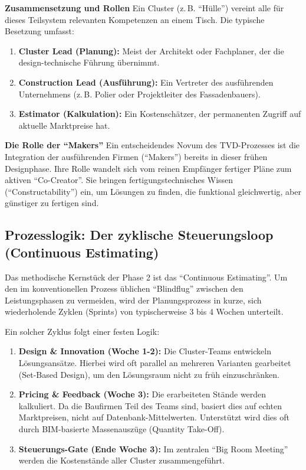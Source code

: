 \textbf{Zusammensetzung und Rollen}
Ein Cluster (z.\,B. \enquote{Hülle}) vereint alle für dieses Teilsystem relevanten Kompetenzen an einem Tisch. Die typische Besetzung umfasst:\autocite[Vgl.][S.~64]{hill_target_2017}

\begin{enumerate}
    \item \textbf{Cluster Lead (Planung):} Meist der Architekt oder Fachplaner, der die design-technische Führung übernimmt.
    \item \textbf{Construction Lead (Ausführung):} Ein Vertreter des ausführenden Unternehmens (z.\,B. Polier oder Projektleiter des Fassadenbauers).
    \item \textbf{Estimator (Kalkulation):} Ein Kostenschätzer, der permanenten Zugriff auf aktuelle Marktpreise hat.
\end{enumerate}

\textbf{Die Rolle der \enquote{Makers}}
Ein entscheidendes Novum des \acs{TVD}-Prozesses ist die Integration der ausführenden Firmen (\enquote{Makers}) bereits in dieser frühen Designphase. Ihre Rolle wandelt sich vom reinen Empfänger fertiger Pläne zum aktiven \enquote{Co-Creator}. Sie bringen fertigungstechnisches Wissen (\enquote{Constructability}) ein, um Lösungen zu finden, die funktional gleichwertig, aber günstiger zu fertigen sind.\autocite[Vgl.][S.~65]{hill_target_2017}



\subsection{Prozesslogik: Der zyklische Steuerungsloop (Continuous Estimating)}
\label{sec:4.4.4}
Das methodische Kernstück der Phase 2 ist das \enquote{Continuous Estimating}. Um den im konventionellen Prozess üblichen \enquote{Blindflug} zwischen den Leistungsphasen zu vermeiden, wird der Planungsprozess in kurze, sich wiederholende Zyklen (Sprints) von typischerweise 3 bis 4 Wochen unterteilt.\autocite[Vgl.][S.~124]{hill_target_2017}

Ein solcher Zyklus folgt einer festen Logik:
\begin{enumerate}
    \item \textbf{Design \& Innovation (Woche 1-2):} Die Cluster-Teams entwickeln Lösungsansätze. Hierbei wird oft parallel an mehreren Varianten gearbeitet (Set-Based Design), um den Lösungsraum nicht zu früh einzuschränken.
    \item \textbf{Pricing \& Feedback (Woche 3):} Die erarbeiteten Stände werden kalkuliert. Da die Baufirmen Teil des Teams sind, basiert dies auf echten Marktpreisen, nicht auf Datenbank-Mittelwerten. Unterstützt wird dies oft durch \acs{BIM}-basierte Massenauszüge (Quantity Take-Off).
    \item \textbf{Steuerungs-Gate (Ende Woche 3):} Im zentralen \enquote{Big Room Meeting} werden die Kostenstände aller Cluster zusammengeführt.
\end{enumerate}

